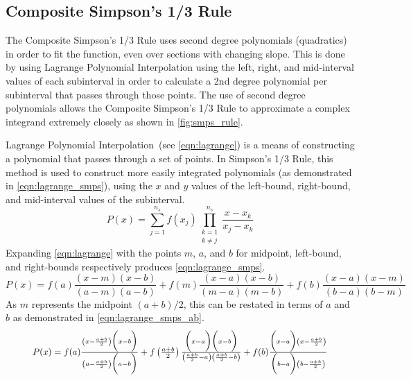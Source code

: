 \documentclass{paper}
\begin{document}
\subsection{Composite Simpson's 1/3 Rule}
\label{sec:smps_rule}
The Composite Simpson's 1/3 Rule uses second degree polynomials (quadratics) in order to fit the function, even over sections with changing slope.
This is done by using Lagrange Polynomial Interpolation using the left, right, and mid-interval values of each subinterval in order to calculate a 2nd degree polynomial per subinterval that passes through those points.
The use of second degree polynomials allows the Composite Simpson's 1/3 Rule to approximate a complex integrand extremely closely as shown in \cref{fig:smps_rule}.
%

%
Lagrange Polynomial Interpolation~(see \cref{eqn:lagrange}) is a means of constructing a polynomial that passes through a set of points.
In Simpson's 1/3 Rule, this method is used to construct more easily integrated polynomials (as demonstrated in \cref{eqn:lagrange_smps}), using the \(x\) and \(y\) values of the left-bound, right-bound, and mid-interval values of the subinterval.
%
\begin{equation}
    \label{eqn:lagrange}
    P(x) = \sum_{j=1}^{n_s} f(x_j) \prod_{\substack{k = 1 \\ k \neq j}}^{n_s} \frac{x - x_k}{x_j - x_k}
\end{equation}
%
Expanding \cref{eqn:lagrange} with the points \(m\), \(a\), and \(b\) for midpoint, left-bound, and right-bounds respectively produces \cref{eqn:lagrange_smps}.
%
\begin{equation}
    \label{eqn:lagrange_smps}
    P(x) = f(a) \frac{(x - m)(x - b)}{(a - m)(a - b)} + f(m) \frac{(x - a)(x - b)}{(m - a)(m - b)} + f(b) \frac{(x - a)(x - m)}{(b - a)(b - m)}
\end{equation}
%
As \(m\) represents the midpoint \((a + b) / 2\), this can be restated in terms of \(a\) and \(b\) as demonstrated in \cref{eqn:lagrange_smps_ab}.
%
\begin{equation}
    \label{eqn:lagrange_smps_ab}
    \resizebox{.9\textwidth}{!} 
    {
    $P(x) = f(a) \frac{\left(x - \frac{a+b}{2}\right)\biggl(x - b\biggr)}{\left(a - \frac{a+b}{2}\right)\biggl(a - b\biggr)} + f\left(\frac{a+b}{2}\right) \frac{\biggl(x - a\biggr)\biggl(x - b\biggr)}{\left(\frac{a+b}{2} - a\right)\left(\frac{a+b}{2} - b\right)} + f(b) \frac{\biggl(x - a\biggr)\left(x - \frac{a+b}{2}\right)}{\biggl(b - a\biggr)\left(b - \frac{a+b}{2}\right)}$
    }
\end{equation}
\end{document}
